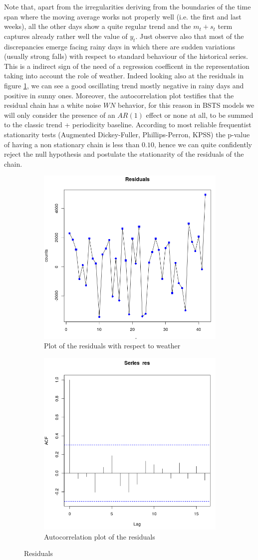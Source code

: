 \documentclass[11pt,twoside]{report}
\begin{document}
Note that, apart from the irregularities deriving from the boundaries of the time span where the moving average works not properly well (i.e. the first and last weeks), all the other days show a quite regular trend and the $ m_t+s_t $ term captures already rather well the value of $ y_t $. Just observe also that most of the discrepancies emerge facing rainy days in which there are sudden variations (usually strong falls) with respect to standard behaviour of the historical series. This is a indirect sign of the need of a regression coefficent in the representation taking into account the role of weather. Indeed looking also at the residuals in figure \ref{fig:res}, we can see a good oscillating trend mostly negative in rainy days and positive in sunny ones. Moreover, the autocorrelation plot testifies that the residual chain has a white noise $ WN $ behavior, for this reason in BSTS models we will only consider the presence of an $ AR(1) $ effect or none at all, to be summed to the classic trend + periodicity baseline. According to most reliable frequentist stationarity tests (Augmented Dickey-Fuller, Phillips-Perron, KPSS) the p-value of having a non stationary chain is less than $ 0.10 $, hence we can quite confidently reject the null hypothesis and postulate the stationarity of the residuals of the chain.

\begin{figure}[H]
	\begin{subfigure}[H]{0.5\linewidth}
		\centering
		\includegraphics[width=65 mm]{pictures/residuals.png}
		\caption{Plot of the residuals with respect to weather}
	\end{subfigure}
	\hfill
	\begin{subfigure}[H]{0.5\linewidth}
		\centering
		\includegraphics[width=65 mm]{pictures/corr.png}
		\caption{Autocorrelation plot of the residuals}
	\end{subfigure}
	\caption{Residuals}
		\label{fig:res}
\end{figure}
\end{document}
